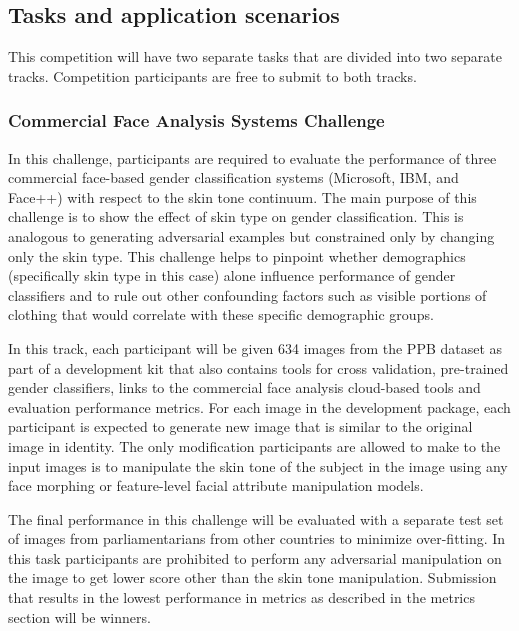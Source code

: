 \documentclass[11pt, oneside]{article}
\begin{document}
\subsection{Tasks and application scenarios}


This competition will have two separate tasks that are divided into two 
separate tracks. Competition participants are free to submit to both tracks.

\subsubsection{Commercial Face Analysis Systems Challenge}
In this challenge, participants are required to evaluate the performance of 
three commercial face-based gender classification systems (Microsoft, IBM, and 
Face++) with respect to the skin tone continuum. The main purpose of this 
challenge is to show the effect of skin type on gender classification. This is 
analogous to generating adversarial examples but constrained only by changing 
only the skin type. This challenge helps to pinpoint whether demographics 
(specifically skin type in this case) alone influence performance of gender 
classifiers and to rule out other confounding factors such as visible portions 
of clothing that would correlate with these specific demographic groups.

In this track, each participant will be given 634 images from the PPB dataset 
as part of a development kit that also contains tools for cross validation, 
pre-trained gender classifiers, links to the commercial face analysis 
cloud-based tools and evaluation performance metrics. For each image in the 
development package, each participant is expected to generate new image that is 
similar to the original image in identity. The only modification participants 
are allowed to make to the input images is to manipulate the skin tone of the 
subject in the image using any face morphing or feature-level facial attribute 
manipulation models.

The final performance in this challenge will be evaluated with a separate test 
set of images from parliamentarians from other countries to minimize 
over-fitting. In this task participants are prohibited to perform any 
adversarial manipulation on the image to get lower score other than the skin 
tone manipulation. Submission that results in the lowest performance in metrics 
as described in the metrics section will be winners.
\end{document}
